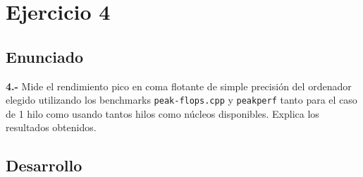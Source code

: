 \section{Ejercicio 4}
\subsection{Enunciado}
\begin{ejer}
    \textbf{4.-} Mide el rendimiento pico en coma flotante de simple precisión del ordenador elegido utilizando los benchmarks
    \texttt{peak-flops.cpp} y \texttt{peakperf} tanto para el caso de 1 hilo como usando tantos hilos como núcleos
    disponibles. Explica los resultados obtenidos.
\end{ejer}
\subsection{Desarrollo}
